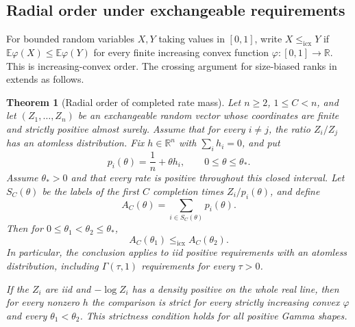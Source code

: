 \documentclass[11pt]{article}
\newtheorem{theorem}{Theorem}
\theoremstyle{definition}
\theoremstyle{remark}
\newcommand{\E}{\mathbb E}
\newcommand{\R}{\mathbb R}
\newcommand{\1}{\mathbf 1}
\begin{document}
\subsection{Radial order under exchangeable requirements}

For bounded random variables \(X,Y\) taking values in \([0,1]\),
write \(X\le_{\mathrm{icx}}Y\) if
\(\E\varphi(X)\le\E\varphi(Y)\) for every finite increasing convex
function \(\varphi:[0,1]\to\R\).  This is increasing-convex order.
The crossing argument for size-biased ranks in~\cite{LongRank2026}
extends as follows.

\begin{theorem}[Radial order of completed rate mass]
\label{thm:completed-rate-mass}
Let \(n\ge2\), \(1\le C<n\), and let
\((Z_1,\ldots,Z_n)\) be an exchangeable random vector whose
coordinates are finite and strictly positive almost surely.  Assume
that for every \(i\ne j\), the ratio \(Z_i/Z_j\) has an atomless
distribution.  Fix \(h\in\R^n\) with \(\sum_i h_i=0\), and put
\begin{equation}\label{eq:completed-mass-rate-ray}
  p_i(\theta)=\frac1n+\theta h_i,
  \qquad 0\le\theta\le\theta_*.
\end{equation}
Assume \(\theta_*>0\) and that every rate is positive throughout
this closed interval.  Let \(S_C(\theta)\) be the labels of the
first \(C\) completion times \(Z_i/p_i(\theta)\), and define
\begin{equation}\label{eq:completed-rate-mass}
  A_C(\theta)=\sum_{i\in S_C(\theta)}p_i(\theta).
\end{equation}
Then for \(0\le\theta_1<\theta_2\le\theta_*\),
\begin{equation}\label{eq:completed-mass-icx}
  A_C(\theta_1)\le_{\mathrm{icx}}A_C(\theta_2).
\end{equation}
In particular, the conclusion applies to iid positive requirements
with an atomless distribution, including \(\Gamma(\tau,1)\)
requirements for every \(\tau>0\).

If the \(Z_i\) are iid and \(-\log Z_i\) has a density positive on
the whole real line, then for every nonzero \(h\) the comparison is
strict for every strictly increasing convex \(\varphi\) and every
\(\theta_1<\theta_2\).  This strictness condition holds for all
positive Gamma shapes.
\end{theorem}
\end{document}
